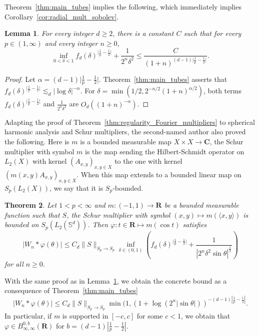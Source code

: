 \documentclass[10pt]{amsart}
\newcommand{\R}{\mathbf{R}}
\newcommand{\C}{\mathbf{C}}
\newtheorem{theorem}{Theorem}[section]
\newtheorem{lemma}[theorem]{Lemma}
\begin{document}
Theorem~\ref{thm:main_tubes} implies the following, which immediately implies Corollary~\ref{cor:radial_mult_sobolev}.
\begin{lemma}\label{lemma:computation_inf}
For every integer $d \geq 2$, there is a constant $C$ such that for every $p \in (1,\infty)$ and every integer $n \geq 0$,
\[ \inf_{0<\delta<1} f_d(\delta)^{\big|\frac 1 p - \frac 1 2\big|}  + \frac{1}{2^n \delta^2} \leq \frac{C}{(1+n)^{(d-1) \big|\frac 1 p - \frac 1 2\big|}}.\]
\end{lemma}
\begin{proof}
Let $\alpha = (d-1) \big|\frac 1 p - \frac 1 2\big|$. Theorem~\ref{thm:main_tubes} asserts that $f_d(\delta)^{\big|\frac 1 p - \frac 1 2\big|} \lesssim_d |\log \delta|^{-\alpha}$. For $\delta = \min(1/2,2^{-n/2} (1+n)^{\alpha/2})$, both terms $f_d(\delta)^{\big|\frac 1 p - \frac 1 2\big|}$ and $\frac{1}{2^n \delta^2}$ are $O_d( (1+n)^{-\alpha})$.
\end{proof}
Adapting the proof of Theorem~\ref{thm:regularity_Fourier_multipliers} to spherical harmonic analysis and Schur multipliers, the second-named author also proved the following. Here is $m$ is a bounded measurable map $X\times X\to \C$, the Schur multiplier with symbol $m$ is the map sending the Hilbert-Schmidt operator on $L_2(X)$ with kernel $(A_{x,y})_{x,y \in X}$ to the one with kernel $(m(x,y) A_{x,y})_{x,y \in X}$. When this map extends to a bounded linear map on $S_p(L_2(X))$, we say that it is $S_p$-bounded.
\begin{theorem}\cite{delasalle2026kakeyaconjecturehighranklattice}
Let $1<p<\infty$ and $m:(-1,1) \to \R$ be a bounded measurable function such that $S$, the Schur multiplier with symbol $(x,y)\mapsto m(\langle x,y\rangle)$ is bounded on $S_p(L_2(\mathbb{S}^d))$. Then $\varphi:t\in \R \mapsto m( \cos t)$ satisfies
  \[ |W_n\ast \varphi(\theta)| \leq C_d \|S\|_{S_p \to S_p} \inf_{\delta \in (0,1)} \left(f_d(\delta)^{\big|\frac 1 p - \frac 1 2\big|} + \frac{1}{|2^n \delta^2 \sin \theta|^{\frac 1 3}} \right)\]
for all $n \geq 0$.
\end{theorem}
With the same proof as in Lemma~\ref{lemma:computation_inf}, we obtain the concrete bound as a consequence of Theorem~\ref{thm:main_tubes}
  \[ |W_n\ast \varphi(\theta)| \leq C_d \|S\|_{S_p \to S_p} \min(1, (1+\log(2^n |\sin \theta|)) ^{-(d-1)|\frac 1 p - \frac 1 2|}.\]
In particular, if $m$ is supported in $[-c,c]$ for some $c<1$, we obtain that $\varphi \in B_{\infty,\infty}^{0,b}(\R)$ for $b=(d-1)|\frac 1 p - \frac 1 2|$.
\end{document}
